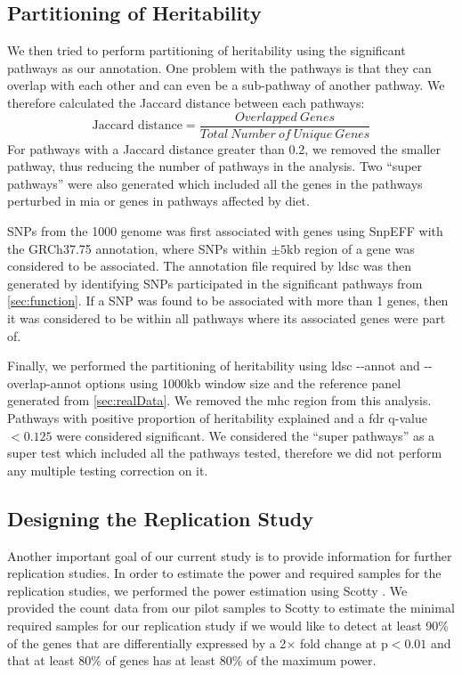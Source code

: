 \subsection{Partitioning of Heritability}
We then tried to perform partitioning of heritability using the significant pathways as our annotation.
One problem with the pathways is that they can overlap with each other and can even be a sub-pathway of another pathway.
We therefore calculated the Jaccard distance between each pathways:
\begin{equation}
\text{Jaccard distance} = \frac{Overlapped\ Genes}{Total\ Number\ of\ Unique\ Genes}
\end{equation}
For pathways with a Jaccard distance greater than 0.2, we removed the smaller pathway, thus reducing the number of pathways in the analysis.
Two ``super pathways'' were also generated which included all the genes in the pathways perturbed in \gls{mia} or genes in pathways affected by diet. 

\glspl{SNP} from the 1000 genome was first associated with genes using SnpEFF \citep{Cingolani2012} with the GRCh37.75 annotation, where \glspl{SNP} within $\pm5$\gls{kb} region of a gene was considered to be associated.
The annotation file required by \gls{ldsc} was then generated by identifying \glspl{SNP} participated in the significant pathways from \cref{sec:function}.
If a \gls{SNP} was found to be associated with more than 1 genes, then it was considered to be within all pathways where its associated genes were part of. 

Finally, we performed the partitioning of heritability using \gls{ldsc} \citep{Bulik-Sullivan2015} -{}-annot and -{}-overlap-annot options using 1000\gls{kb} window size and the reference panel generated from \cref{sec:realData}.
We removed the \gls{mhc} region from this analysis.
Pathways with positive proportion of heritability explained and a \gls{fdr} q-value $<0.125$ were considered significant.
We considered the ``super pathways'' as a super test which included all the pathways tested, therefore we did not perform any multiple testing correction on it.

\subsection{Designing the Replication Study}
Another important goal of our current study is to provide information for further replication studies. 
In order to estimate the power and required samples for the replication studies, we performed the power estimation using Scotty \citep{Busby2013}.
We provided the count data from our pilot samples to Scotty to estimate the minimal required samples for our replication study if we would like to detect at least 90\% of the genes that are differentially expressed by a 2$\times$ fold change at p$<0.01$ and that at least 80\% of genes has at least 80\% of the maximum power.

